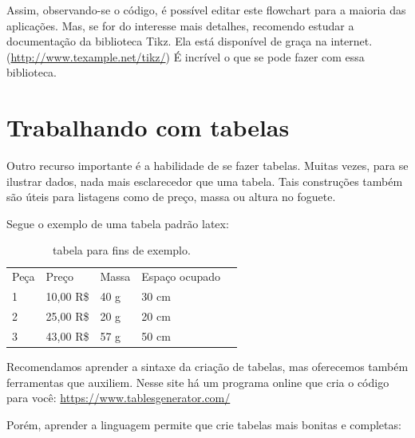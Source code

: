 Assim, observando-se o código, é possível editar este flowchart para a maioria das aplicações. Mas, se for do interesse mais detalhes, recomendo estudar a documentação da biblioteca Tikz. Ela está disponível de graça na internet. (\url{http://www.texample.net/tikz/}) É incrível o que se pode fazer com essa biblioteca.



\chapter{Trabalhando com tabelas}

Outro recurso importante é a habilidade de se fazer tabelas. Muitas vezes, para se ilustrar dados, nada mais esclarecedor que uma tabela. Tais construções também são úteis para listagens como de preço, massa ou altura no foguete. 

Segue o exemplo de uma tabela padrão latex: 


\begin{table}[h!]
	\centering
	\begin{tabular}{|llll|l}
		\cline{1-4}
		\multicolumn{1}{|l|}{Peça} & \multicolumn{1}{l|}{Preço} & \multicolumn{1}{l|}{Massa} & Espaço  ocupado &  \\ \cline{1-4}
		1                          & 10,00 R\$                  & 40 g                       & 30 cm           &  \\
		2                          & 25,00 R\$                  & 20 g                       & 20 cm           &  \\
		3                          & 43,00 R\$                  & 57 g                       & 50 cm           &  \\ \cline{1-4}
	\end{tabular}
	\caption{tabela para fins de exemplo.}
\end{table}


Recomendamos aprender a sintaxe da criação de tabelas, mas oferecemos também ferramentas que auxiliem. Nesse site há um programa online que cria o código para você:
\url{https://www.tablesgenerator.com/}

Porém, aprender a linguagem permite que crie tabelas mais bonitas e completas:

